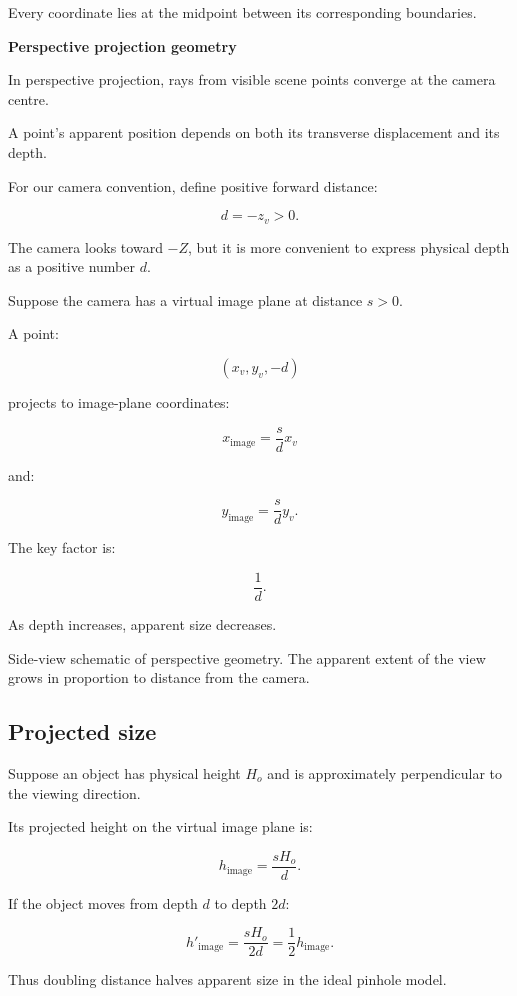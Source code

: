 Every coordinate lies at the midpoint between its corresponding boundaries.

\textbf{Perspective projection geometry}

In perspective projection, rays from visible scene points converge at the camera centre.

A point's apparent position depends on both its transverse displacement and its depth.

For our camera convention, define positive forward distance:

\[
 \boxed{d=-z_v>0}.
\]

The camera looks toward \(-Z\), but it is more convenient to express physical depth as a positive number \(d\).

Suppose the camera has a virtual image plane at distance \(s>0\).

A point:

\[
 (x_v,y_v,-d)
\]

projects to image-plane coordinates:

\[
 \boxed{ x_{\mathrm{image}}=\frac{s}{d}x_v }
\]

and:

\[
 \boxed{ y_{\mathrm{image}}=\frac{s}{d}y_v }.
\]

The key factor is:

\[
 \frac1d.
\]

As depth increases, apparent size decreases.

Side-view schematic of perspective geometry. The apparent extent of the view grows in proportion to distance from the camera.

\subsection{Projected size}\label{02-foundations-ii-ch033-projected-size}

Suppose an object has physical height \(H_o\) and is approximately perpendicular to the viewing direction.

Its projected height on the virtual image plane is:

\[
 \boxed{ h_{\mathrm{image}}=\frac{sH_o}{d} }.
\]

If the object moves from depth \(d\) to depth \(2d\):

\[
 h'_{\mathrm{image}} = \frac{sH_o}{2d} = \frac12h_{\mathrm{image}}.
\]

Thus doubling distance halves apparent size in the ideal pinhole model.

